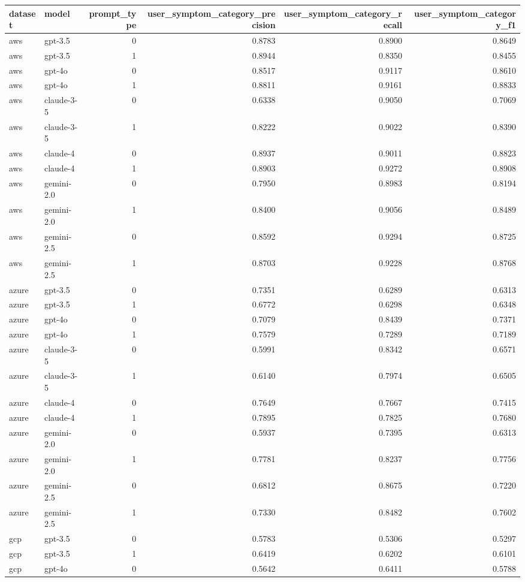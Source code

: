 \begin{tabular}{llrrrr}
\toprule
dataset & model & prompt_type & user_symptom_category_precision & user_symptom_category_recall & user_symptom_category_f1 \\
\midrule
aws & gpt-3.5 & 0 & 0.8783 & 0.8900 & 0.8649 \\
aws & gpt-3.5 & 1 & 0.8944 & 0.8350 & 0.8455 \\
aws & gpt-4o & 0 & 0.8517 & 0.9117 & 0.8610 \\
aws & gpt-4o & 1 & 0.8811 & 0.9161 & 0.8833 \\
aws & claude-3-5 & 0 & 0.6338 & 0.9050 & 0.7069 \\
aws & claude-3-5 & 1 & 0.8222 & 0.9022 & 0.8390 \\
aws & claude-4 & 0 & 0.8937 & 0.9011 & 0.8823 \\
aws & claude-4 & 1 & 0.8903 & 0.9272 & 0.8908 \\
aws & gemini-2.0 & 0 & 0.7950 & 0.8983 & 0.8194 \\
aws & gemini-2.0 & 1 & 0.8400 & 0.9056 & 0.8489 \\
aws & gemini-2.5 & 0 & 0.8592 & 0.9294 & 0.8725 \\
aws & gemini-2.5 & 1 & 0.8703 & 0.9228 & 0.8768 \\
azure & gpt-3.5 & 0 & 0.7351 & 0.6289 & 0.6313 \\
azure & gpt-3.5 & 1 & 0.6772 & 0.6298 & 0.6348 \\
azure & gpt-4o & 0 & 0.7079 & 0.8439 & 0.7371 \\
azure & gpt-4o & 1 & 0.7579 & 0.7289 & 0.7189 \\
azure & claude-3-5 & 0 & 0.5991 & 0.8342 & 0.6571 \\
azure & claude-3-5 & 1 & 0.6140 & 0.7974 & 0.6505 \\
azure & claude-4 & 0 & 0.7649 & 0.7667 & 0.7415 \\
azure & claude-4 & 1 & 0.7895 & 0.7825 & 0.7680 \\
azure & gemini-2.0 & 0 & 0.5937 & 0.7395 & 0.6313 \\
azure & gemini-2.0 & 1 & 0.7781 & 0.8237 & 0.7756 \\
azure & gemini-2.5 & 0 & 0.6812 & 0.8675 & 0.7220 \\
azure & gemini-2.5 & 1 & 0.7330 & 0.8482 & 0.7602 \\
gcp & gpt-3.5 & 0 & 0.5783 & 0.5306 & 0.5297 \\
gcp & gpt-3.5 & 1 & 0.6419 & 0.6202 & 0.6101 \\
gcp & gpt-4o & 0 & 0.5642 & 0.6411 & 0.5788 \\

\end{tabular}

